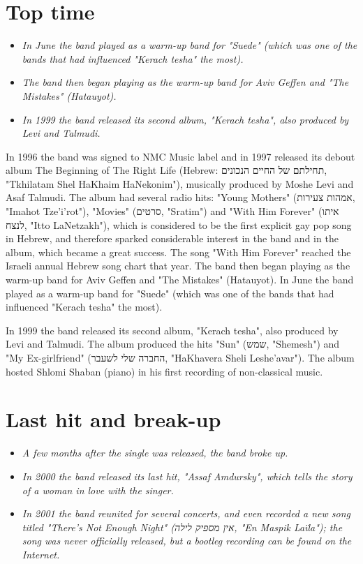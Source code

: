 \section{Top time}\label{top-time}

\begin{itemize}
\item
  \emph{In June the band played as a warm-up band for "Suede" (which was
  one of the bands that had influenced "Kerach tesha" the most).}
\item
  \emph{The band then began playing as the warm-up band for Aviv Geffen
  and "The Mistakes" (Hatauyot).}
\item
  \emph{In 1999 the band released its second album, "Kerach tesha", also
  produced by Levi and Talmudi.}
\end{itemize}

In 1996 the band was signed to NMC Music label and in 1997 released its
debout album The Beginning of The Right Life (Hebrew: תחילתם של החיים
הנכונים, "Tkhilatam Shel HaKhaim HaNekonim"), musically produced by
Moshe Levi and Asaf Talmudi. The album had several radio hits: "Young
Mothers" (אמהות צעירות, "Imahot Tze'i'rot"), "Movies" (סרטים, "Sratim")
and "With Him Forever" (איתו לנצח, "Itto LaNetzakh"), which is
considered to be the first explicit gay pop song in Hebrew, and
therefore sparked considerable interest in the band and in the album,
which became a great success. The song "With Him Forever" reached the
Israeli annual Hebrew song chart that year. The band then began playing
as the warm-up band for Aviv Geffen and "The Mistakes" (Hatauyot). In
June the band played as a warm-up band for "Suede" (which was one of the
bands that had influenced "Kerach tesha" the most).

In 1999 the band released its second album, "Kerach tesha", also
produced by Levi and Talmudi. The album produced the hits "Sun" (שמש,
"Shemesh") and "My Ex-girlfriend" (החברה שלי לשעבר, "HaKhavera Sheli
Leshe'avar"). The album hosted Shlomi Shaban (piano) in his first
recording of non-classical music.

\section{Last hit and break-up}\label{last-hit-and-break-up}

\begin{itemize}
\item
  \emph{A few months after the single was released, the band broke up.}
\item
  \emph{In 2000 the band released its last hit, "Assaf Amdursky", which
  tells the story of a woman in love with the singer.}
\item
  \emph{In 2001 the band reunited for several concerts, and even
  recorded a new song titled "There's Not Enough Night" (אין מספיק לילה,
  "En Maspik Laïla"); the song was never officially released, but a
  bootleg recording can be found on the Internet.}
\end{itemize}

